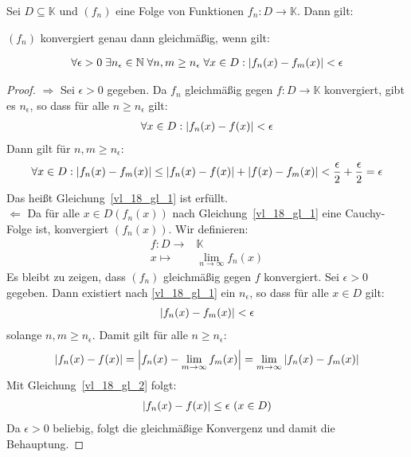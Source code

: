 \begin{Satz}{\label{vl_18_satz_1}%
	Sei $D \subseteq \mathbb{K}$ und $(f_n)$ eine Folge von Funktionen $f_n: D 
	\rightarrow \mathbb{K}$. Dann gilt: 
	\begin{center}
		$(f_n)$ konvergiert genau dann gleichmäßig, wenn gilt:
	\end{center}
	\begin{align}\label{vl_18_gl_1}
		\forall \epsilon > 0 \; \exists n_{\epsilon} \in \mathbb{N} \;\forall n,m \geq 	
		n_{\epsilon} \;\forall x \in D : \abs{f_n(x) - f_m(x)} < \epsilon
	\end{align}
}\end{Satz}

\begin{proof}
	$\Rightarrow$ Sei $\epsilon > 0$ gegeben. Da $f_n$ gleichmäßig gegen $f: D 
	\rightarrow \mathbb{K}$ konvergiert, gibt es $n_{\epsilon}$, so dass für alle 
	$n \geq n_{\epsilon}$ gilt:
	\begin{align*}
		\forall x \in D: \abs{ f_n(x) -f(x)} < \epsilon
	\end{align*}
	Dann gilt für $n,m \geq n_{\epsilon}$:
	\begin{align*}
		\forall x \in D: \abs{f_n(x) - f_m(x)} \leq \abs{f_n(x) -f(x)} + 
		\abs{f(x) -f_m(x)} < \frac{\epsilon}{2} + \frac{\epsilon}{2} = \epsilon
	\end{align*}
	Das heißt Gleichung~\ref{vl_18_gl_1} ist erfüllt. \\
	$\Leftarrow$ Da für alle $x \in D (f_n(x))$ nach Gleichung~\ref{vl_18_gl_1} 
	eine Cauchy-Folge ist, konvergiert $(f_n(x))$.
	Wir definieren: 
	\begin{align*}
		f: D \rightarrow & \mathbb{K} \\
		x \mapsto & \lim\limits_{n \rightarrow \infty} f_n(x)
	\end{align*}		
	Es bleibt zu zeigen, dass $(f_n)$ gleichmäßig gegen $f$ konvergiert. 
	Sei $\epsilon > 0$ gegeben. Dann existiert nach \ref{vl_18_gl_1} ein 
	$n_{\epsilon}$, so dass für alle $x \in D$ gilt:
	\begin{align}\label{vl_18_gl_2}
		\abs{f_n(x) - f_m(x)} < \epsilon
	\end{align}
	solange $n,m \geq n_{\epsilon}$. Damit gilt für alle $n \geq n_{\epsilon}$:
	\begin{align*}
		\abs{f_n(x) - f(x)} = \abs{f_n(x) - \lim\limits_{m \rightarrow \infty} 
		{f_m(x)}} = \lim\limits_{m \rightarrow \infty} \abs{f_n(x) - f_m(x)}
	\end{align*}
	Mit Gleichung~\ref{vl_18_gl_2} folgt:
	\begin{align*}
		\abs{f_n(x) -f(x)} \leq \epsilon \text{ } (x \in D)
\end{align*}		
	Da $\epsilon > 0$ beliebig, folgt die gleichmäßige Konvergenz und 
	damit die Behauptung.
\end{proof}

